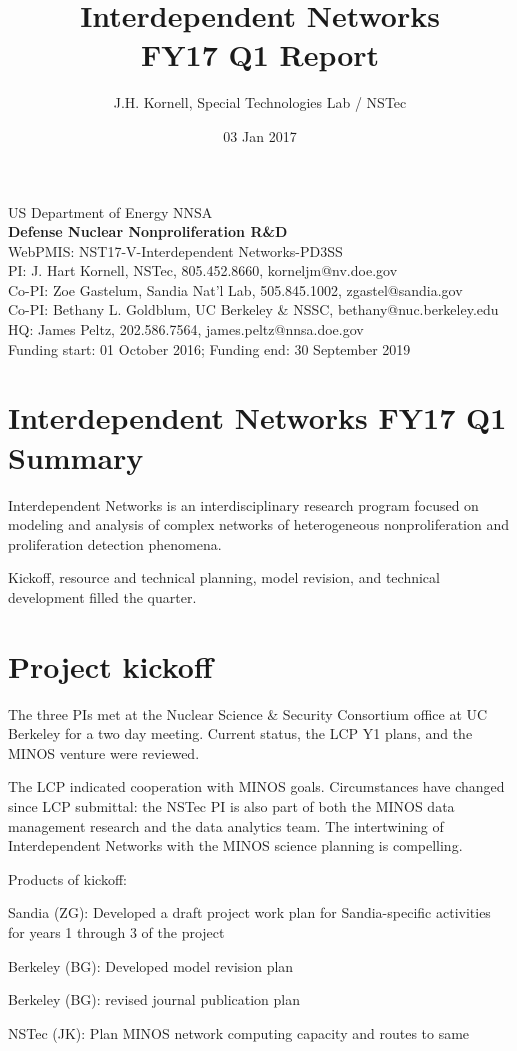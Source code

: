 \documentclass[11pt]{article} %
\title{Interdependent Networks\\FY17 Q1 Report}
\author{J.H. Kornell, Special Technologies Lab / NSTec}
\date{03 Jan 2017} %
\begin{document}
\maketitle

\vfill
\begin{center}
US Department of Energy NNSA \\
\textbf{Defense Nuclear Nonproliferation R\&D} \\
WebPMIS: NST17-V-Interdependent Networks-PD3SS \\
PI: J. Hart Kornell, NSTec, 805.452.8660, korneljm@nv.doe.gov \\
Co-PI: Zoe Gastelum, Sandia Nat'l Lab, 505.845.1002, zgastel@sandia.gov \\
Co-PI: Bethany L. Goldblum, UC Berkeley \& NSSC, bethany@nuc.berkeley.edu \\
HQ: James Peltz, 202.586.7564, james.peltz@nnsa.doe.gov \\
Funding start: 01 October 2016; Funding end: 30 September 2019
\end{center}
\pagebreak
\section{Interdependent Networks FY17 Q1 Summary}
\noindent Interdependent Networks  is an interdisciplinary research program focused on modeling and analysis of complex networks of heterogeneous nonproliferation and proliferation detection phenomena. 

Kickoff, resource and technical planning,  model revision, and technical development filled the quarter.

\section{Project kickoff}
\noindent The three PIs met at the Nuclear Science \& Security Consortium office at UC Berkeley for a two day meeting. Current status, the LCP Y1 plans, and the MINOS venture were reviewed. 

The LCP indicated cooperation with MINOS goals. Circumstances have changed since LCP submittal: the NSTec PI is also part of both the MINOS data management research and the data analytics team. The intertwining of Interdependent Networks with the MINOS science planning is compelling. 

Products of kickoff:
\renewcommand\labelitemi{\tiny$\bullet$}
\begin{itemize*}
\item Sandia (ZG): Developed a draft project work plan for Sandia-specific activities for years 1 through 3 of the project
\item Berkeley (BG): Developed model revision plan
\item Berkeley (BG): revised journal publication plan
\item NSTec (JK): Plan MINOS network computing capacity and routes to same
\end{itemize*}
\end{document}
